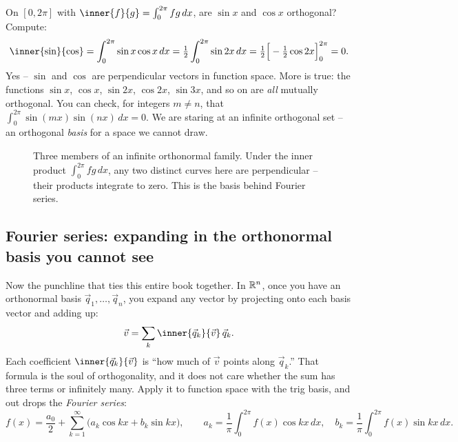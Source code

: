 \begin{example}
\label{ch37:ex-orthfun}
On $[0,2\pi]$ with $\inner{f}{g}=\int_0^{2\pi} fg\,dx$, are $\sin x$ and $\cos x$
orthogonal? Compute:
\[
  \inner{\sin}{\cos} = \int_0^{2\pi}\sin x\cos x\,dx
  = \tfrac12\int_0^{2\pi}\sin 2x\,dx
  = \tfrac12\Big[-\tfrac12\cos 2x\Big]_0^{2\pi} = 0.
\]
Yes -- $\sin$ and $\cos$ are perpendicular vectors in function space. More is true:
the functions $\sin x$, $\cos x$, $\sin 2x$, $\cos 2x$, $\sin 3x$, and so on are
\emph{all} mutually orthogonal. You can check, for integers $m\neq n$, that $\int_0^{2\pi}\sin(mx)\sin(nx)\,dx=0$.
We are staring at an infinite orthogonal set -- an orthogonal \emph{basis} for a
space we cannot draw.
\end{example}

\begin{figure}[H]
\centering
{}
\caption{Three members of an infinite orthonormal family. Under the inner product
$\int_0^{2\pi}fg\,dx$, any two distinct curves here are perpendicular -- their
products integrate to zero. This is the basis behind Fourier series.}
\label{ch37:fig-sincos}
\end{figure}

\subsection{Fourier series: expanding in the orthonormal basis you cannot see}
\label{ch37:fourier}

Now the punchline that ties this entire book together. In $\mathbb{R}^n$, once you have an
orthonormal basis $\vec{q}_1,\dots,\vec{q}_n$, you expand any vector by projecting
onto each basis vector and adding up:
\[
  \vec{v} = \sum_{k} \inner{\vec{q}_k}{\vec{v}}\,\vec{q}_k.
\]
Each coefficient $\inner{\vec{q}_k}{\vec{v}}$ is ``how much of $\vec{v}$ points along
$\vec{q}_k$.'' That formula is the soul of orthogonality, and it does not care
whether the sum has three terms or infinitely many. Apply it to function space with
the trig basis, and out drops the \emph{Fourier series}:
\[
  f(x) = \frac{a_0}{2} + \sum_{k=1}^{\infty}\Big(a_k\cos kx + b_k\sin kx\Big),
  \qquad
  a_k = \frac{1}{\pi}\int_0^{2\pi} f(x)\cos kx\,dx,\quad
  b_k = \frac{1}{\pi}\int_0^{2\pi} f(x)\sin kx\,dx.
\]

